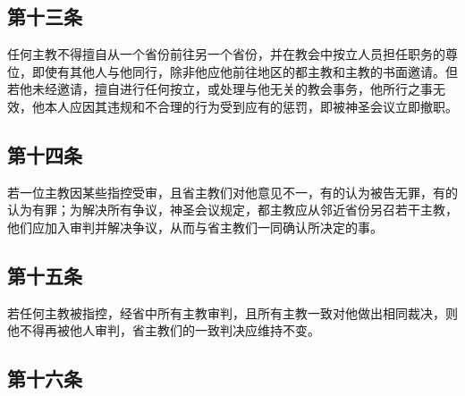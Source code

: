\par


\subsection{第十三条}

任何主教不得擅自从一个省份前往另一个省份，并在教会中按立人员担任职务的尊位，即使有其他人与他同行，除非他应他前往地区的都主教和主教的书面邀请。但若他未经邀请，擅自进行任何按立，或处理与他无关的教会事务，他所行之事无效，他本人应因其违规和不合理的行为受到应有的惩罚，即被神圣会议立即撤职。\par


\subsection{第十四条}

若一位主教因某些指控受审，且省主教们对他意见不一，有的认为被告无罪，有的认为有罪；为解决所有争议，神圣会议规定，都主教应从邻近省份另召若干主教，他们应加入审判并解决争议，从而与省主教们一同确认所决定的事。\par


\subsection{第十五条}

若任何主教被指控，经省中所有主教审判，且所有主教一致对他做出相同裁决，则他不得再被他人审判，省主教们的一致判决应维持不变。\par


\subsection{第十六条}

